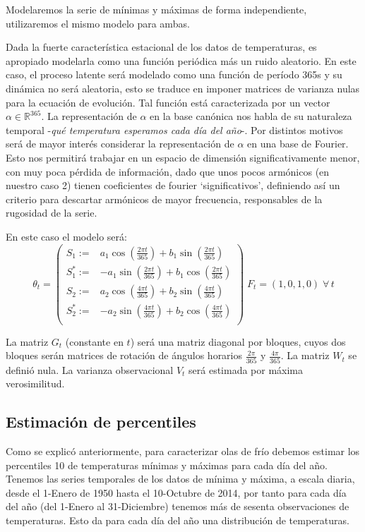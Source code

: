 \documentclass[12pt]{article}\usepackage[]{graphicx}\usepackage[]{color}
\newcommand{\RR}{\mathbb{R}}
\begin{document}
Modelaremos la serie de mínimas y máximas de forma independiente, utilizaremos el mismo modelo para ambas.

Dada la fuerte característica estacional de los datos de temperaturas, es apropiado modelarla como una función periódica más un ruido aleatorio. En este caso, el proceso latente será modelado como una función de período 365s y su dinámica no será aleatoria, esto se traduce en imponer matrices de varianza nulas para la ecuación de evolución.
Tal función está caracterizada por un vector $\alpha \in \RR^{365}$. La representación de $\alpha$ en la base canónica nos habla de su naturaleza temporal -\textit{qué temperatura esperamos cada día del año}-. Por distintos motivos será de mayor interés considerar la representación de $\alpha$ en una base de Fourier. Esto nos permitirá trabajar en un espacio de dimensión significativamente menor, con muy poca pérdida de información, dado que unos pocos armónicos (en nuestro caso 2) tienen coeficientes de fourier `significativos', definiendo así un criterio para descartar armónicos de mayor frecuencia, responsables de la rugosidad de la serie.

En este caso el modelo será:
$$\theta_t=\left(\begin{array}{lr}
S_1:=& a_1\cos\left(\frac{2\pi t}{365}\right) + b_1 \sin\left(\frac{2\pi t}{365}\right) \\
S_1^*:=& -a_1\sin\left(\frac{2\pi t}{365}\right) + b_1 \cos\left(\frac{2\pi t}{365}\right) \\
S_2:= &a_2\cos\left(\frac{4\pi t}{365}\right) + b_2 \sin\left(\frac{4\pi t}{365}\right) \\
S_2^*:=& -a_2\sin\left(\frac{4\pi t}{365}\right) + b_2 \cos\left(\frac{4\pi t}{365}\right) \\
\end{array}\right)\; F_t=(1,0,1,0) \; \forall \, t$$

La matriz $G_t$ (constante en $t$) será una matriz diagonal por bloques, cuyos dos bloques serán matrices de rotación de ángulos horarios $\frac{2\pi}{365}$ y $\frac{4\pi}{365}$. La matriz $W_t$ se definió nula. La varianza observacional $V_t$ será estimada por máxima verosimilitud.

\subsection{Estimación de percentiles}

Como se explicó anteriormente, para caracterizar olas de frío debemos estimar los percentiles 10 de temperaturas mínimas y máximas para cada día del año. Tenemos las series temporales de los datos de mínima y máxima, a escala diaria, desde el 1-Enero de 1950 hasta el 10-Octubre de 2014, por tanto para cada día del año (del 1-Enero al 31-Diciembre) tenemos más de sesenta observaciones de temperaturas. Esto da para cada día del año una distribución de temperaturas.  %
\end{document}
